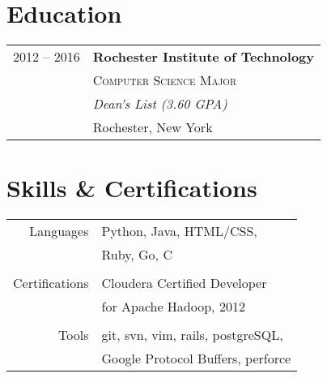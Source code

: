 \documentclass[10pt]{article} %
\begin{document}
{\begin{minipage}[t]{0.44\textwidth}

\section{Education} 

\begin{tabular}{rl} %


2012 -- 2016 & \textbf{Rochester Institute of Technology} \\ 
& \textsc{Computer Science Major} \\ 
& \textit{Dean's List (3.60 GPA)}\\
& Rochester, New York 
\end{tabular}
\smallskip

\section{Skills \& Certifications} 

\begin{tabular}{rl}
Languages
& Python, Java, HTML/CSS, \\ 
& Ruby, Go, C \\ 
& \\
Certifications
& Cloudera Certified Developer \\
& for Apache Hadoop, 2012 \\
& \\
Tools
& git, svn, vim, rails, postgreSQL, \\
& Google Protocol Buffers, perforce \\
\end{tabular}



\end{minipage}}
\end{document}
